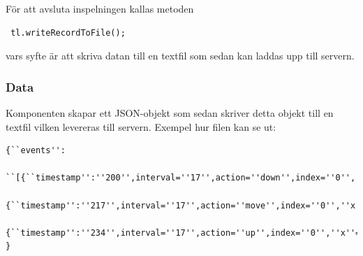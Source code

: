  För att avsluta inspelningen kallas metoden
 \begin{verbatim}
 tl.writeRecordToFile();
 \end{verbatim}
 vars syfte är att skriva datan till en textfil som sedan kan laddas upp till servern.
\subsubsection{Data}
Komponenten skapar ett JSON-objekt som sedan skriver detta objekt till en textfil vilken levereras till servern. Exempel hur filen kan se ut:
\begin{verbatim}
{``events'':
	``[{``timestamp'':''200'',interval=''17'',action=''down'',index=''0'',''x''=''310'',y=''670''},
	     {``timestamp'':''217'',interval=''17'',action=''move'',index=''0'',''x''=''320'',y=''680''},
	     {``timestamp'':''234'',interval=''17'',action=''up'',index=''0'',''x''=''330'',y=''700''}]''
}
\end{verbatim}